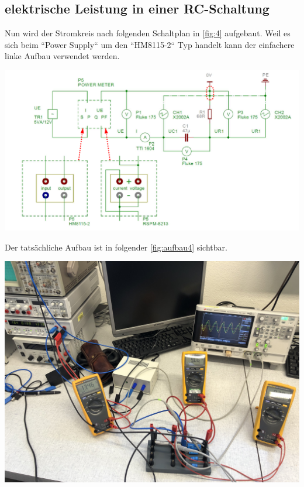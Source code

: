 \documentclass[11pt,ngerman]{scrartcl}
\begin{document}
\subsection{elektrische Leistung in einer RC-Schaltung}

Nun wird der Stromkreis nach folgenden Schaltplan in \autoref{fig:4} aufgebaut. Weil es sich beim ``Power Supply`` um den ``HM8115-2`` Typ handelt kann der einfachere linke Aufbau verwendet werden.

\begin{center}
	\begin{minipage}[t]{0.8\textwidth}
		\includegraphics[width=\textwidth]{skizze_4}
		\label{fig:4}
	\end{minipage}
\end{center}

\noindent Der tatsächliche Aufbau ist in folgender \autoref{fig:aufbau4} sichtbar.

\begin{center}
	\begin{minipage}[t]{0.7\textwidth}
		\includegraphics[width=\textwidth]{aufbau4}
		\label{fig:aufbau4}
	\end{minipage}
\end{center}
\end{document}

